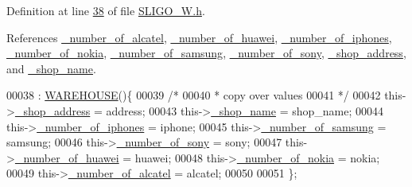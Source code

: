 Definition at line \hyperlink{_s_l_i_g_o___w_8h_source_l00038}{38} of file \hyperlink{_s_l_i_g_o___w_8h_source}{S\+L\+I\+G\+O\+\_\+\+W.\+h}.



References \hyperlink{_s_l_i_g_o___w_8h_source_l00117}{\+\_\+number\+\_\+of\+\_\+alcatel}, \hyperlink{_s_l_i_g_o___w_8h_source_l00115}{\+\_\+number\+\_\+of\+\_\+huawei}, \hyperlink{_s_l_i_g_o___w_8h_source_l00112}{\+\_\+number\+\_\+of\+\_\+iphones}, \hyperlink{_s_l_i_g_o___w_8h_source_l00116}{\+\_\+number\+\_\+of\+\_\+nokia}, \hyperlink{_s_l_i_g_o___w_8h_source_l00113}{\+\_\+number\+\_\+of\+\_\+samsung}, \hyperlink{_s_l_i_g_o___w_8h_source_l00114}{\+\_\+number\+\_\+of\+\_\+sony}, \hyperlink{_s_l_i_g_o___w_8h_source_l00110}{\+\_\+shop\+\_\+address}, and \hyperlink{_s_l_i_g_o___w_8h_source_l00111}{\+\_\+shop\+\_\+name}.


\begin{DoxyCode}
00038                                                                                                            
                     : \hyperlink{class_w_a_r_e_h_o_u_s_e_a7a924d389af91f54ed0e1d1d8d56ec57_a7a924d389af91f54ed0e1d1d8d56ec57}{WAREHOUSE}()\{
00039         \textcolor{comment}{/*}
00040 \textcolor{comment}{         * copy over values
}
00041 \textcolor{comment}{         */}
00042         this->\hyperlink{class_s_l_i_g_o___w_ade08b79101c67997dde54515f2088b9d_ade08b79101c67997dde54515f2088b9d}{\_shop\_address} = address;
00043         this->\hyperlink{class_s_l_i_g_o___w_a01bebef43ff4b4d9d728489f05b94d86_a01bebef43ff4b4d9d728489f05b94d86}{\_shop\_name} = shop\_name;
00044         this->\hyperlink{class_s_l_i_g_o___w_aa958eed564796bb349d15bf2b2e3208d_aa958eed564796bb349d15bf2b2e3208d}{\_number\_of\_iphones} = iphone;
00045         this->\hyperlink{class_s_l_i_g_o___w_a2c7845560ec14452132d659eb54f2cec_a2c7845560ec14452132d659eb54f2cec}{\_number\_of\_samsung} = samsung;
00046         this->\hyperlink{class_s_l_i_g_o___w_a0ccf87fe78352e1eac98ed3c85810caa_a0ccf87fe78352e1eac98ed3c85810caa}{\_number\_of\_sony} = sony;
00047         this->\hyperlink{class_s_l_i_g_o___w_af9ca2fb509b7b8ca9f1860ece827501f_af9ca2fb509b7b8ca9f1860ece827501f}{\_number\_of\_huawei} = huawei;
00048         this->\hyperlink{class_s_l_i_g_o___w_a9fe78b9365c145432d58cb947b01111a_a9fe78b9365c145432d58cb947b01111a}{\_number\_of\_nokia} = nokia;
00049         this->\hyperlink{class_s_l_i_g_o___w_acbf32331901a3fc710c5c97d286b6fcf_acbf32331901a3fc710c5c97d286b6fcf}{\_number\_of\_alcatel} = alcatel;
00050         
00051     \};
\end{DoxyCode}
